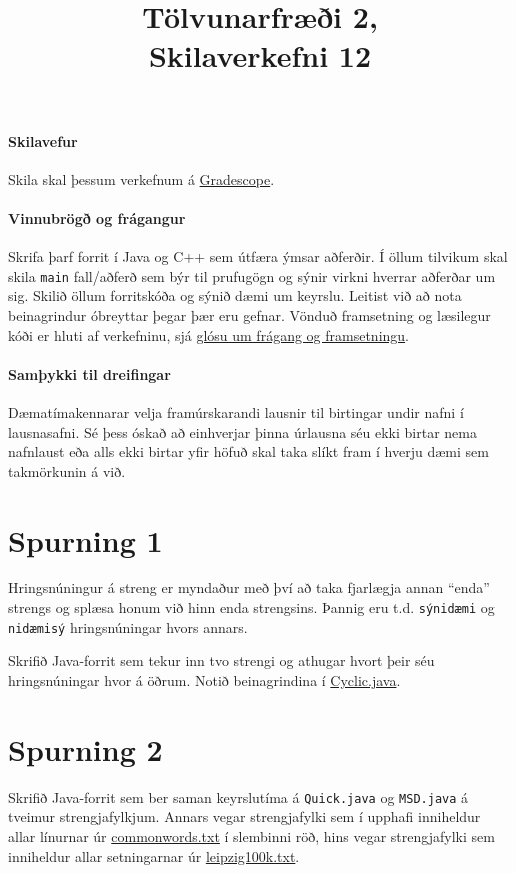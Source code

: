 \documentclass{article}
\title{Tölvunarfræði 2, \semester \\ Skilaverkefni 12}
\author{}
\begin{document}
\maketitle
{}

\paragraph{Skilavefur} Skila skal þessum verkefnum á \href{https://gradescope.com/courses/5640}{Gradescope}.

\paragraph{Vinnubrögð og frágangur} Skrifa þarf forrit í Java og C++ sem útfæra ýmsar aðferðir. Í öllum tilvikum skal skila \texttt{main} fall/aðferð sem býr til prufugögn og sýnir virkni hverrar aðferðar um sig. Skilið öllum forritskóða og sýnið dæmi um keyrslu. Leitist við að nota beinagrindur óbreyttar þegar þær eru gefnar. Vönduð framsetning og læsilegur kóði er hluti af verkefninu, sjá \href{https://piazza.com/class/ixkicfen49l111?cid=52}{glósu um frágang og framsetningu}.

\paragraph{Samþykki til dreifingar} Dæmatímakennarar velja framúrskarandi lausnir til birtingar undir nafni í lausnasafni. Sé þess óskað að einhverjar þinna úrlausna séu ekki birtar nema nafnlaust eða alls ekki birtar yfir höfuð skal taka slíkt fram í hverju dæmi sem takmörkunin á við.

\section{Spurning 1}
Hringsnúningur á streng er myndaður með því að taka fjarlægja annan ``enda'' strengs og splæsa honum við hinn enda strengsins. Þannig eru t.d. \texttt{sýnidæmi} og \texttt{nidæmisý} hringsnúningar hvors annars.

Skrifið Java-forrit sem tekur inn tvo strengi og athugar hvort þeir séu hringsnúningar hvor á öðrum. Notið beinagrindina í \href{https://github.com/Ernir/kennsluefni/tree/master/T2/Code/w12/Cyclic.java}{Cyclic.java}.

\section{Spurning 2}
Skrifið Java-forrit sem ber saman keyrslutíma á \texttt{Quick.java} og \texttt{MSD.java} á tveimur strengjafylkjum. Annars vegar strengjafylki sem í upphafi inniheldur allar línurnar úr \href{http://introcs.cs.princeton.edu/java/data/commonwords.txt}{commonwords.txt} í slembinni röð, hins vegar strengjafylki sem inniheldur allar setningarnar úr \href{http://introcs.cs.princeton.edu/java/data/leipzig/leipzig100k.txt}{leipzig100k.txt}.
\end{document}
